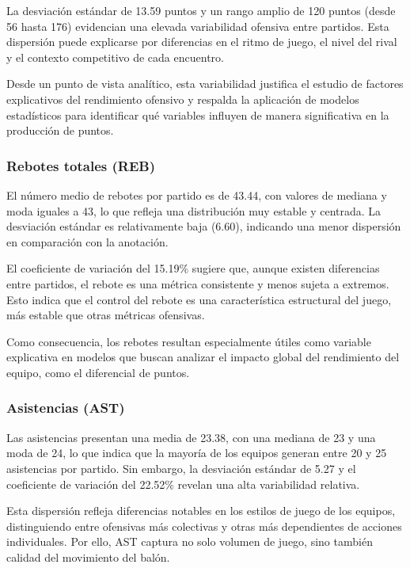\documentclass[12pt]{article}
\begin{document}
La desviación estándar de 13.59 puntos y un rango amplio de 120 puntos (desde 56 hasta 176)
evidencian una elevada variabilidad ofensiva entre partidos. Esta dispersión puede explicarse
por diferencias en el ritmo de juego, el nivel del rival y el contexto competitivo de cada encuentro.

Desde un punto de vista analítico, esta variabilidad justifica el estudio de factores explicativos
del rendimiento ofensivo y respalda la aplicación de modelos estadísticos para identificar qué
variables influyen de manera significativa en la producción de puntos.

\subsubsection*{Rebotes totales (REB)}

El número medio de rebotes por partido es de 43.44, con valores de mediana y moda iguales a 43,
lo que refleja una distribución muy estable y centrada. La desviación estándar es relativamente
baja (6.60), indicando una menor dispersión en comparación con la anotación.

El coeficiente de variación del 15.19\% sugiere que, aunque existen diferencias entre partidos,
el rebote es una métrica consistente y menos sujeta a extremos. Esto indica que el control del
rebote es una característica estructural del juego, más estable que otras métricas ofensivas.

Como consecuencia, los rebotes resultan especialmente útiles como variable explicativa en modelos
que buscan analizar el impacto global del rendimiento del equipo, como el diferencial de puntos.

\subsubsection*{Asistencias (AST)}

Las asistencias presentan una media de 23.38, con una mediana de 23 y una moda de 24, lo que
indica que la mayoría de los equipos generan entre 20 y 25 asistencias por partido. Sin embargo,
la desviación estándar de 5.27 y el coeficiente de variación del 22.52\% revelan una alta variabilidad
relativa.

Esta dispersión refleja diferencias notables en los estilos de juego de los equipos, distinguiendo
entre ofensivas más colectivas y otras más dependientes de acciones individuales. Por ello, AST
captura no solo volumen de juego, sino también calidad del movimiento del balón.
\end{document}
